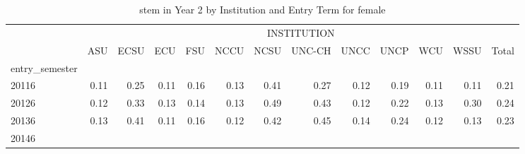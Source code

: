 \begin{table}[!h]
\caption{stem in Year 2 by Institution and Entry Term for female}
\centering
\begin{tabular}{lllllllllllll}
\cline{1-13}
\multicolumn{1}{c}{} &
  \multicolumn{12}{|c}{INSTITUTION} \\
\multicolumn{1}{c}{} &
  \multicolumn{1}{|r}{ASU} &
  \multicolumn{1}{r}{ECSU} &
  \multicolumn{1}{r}{ECU} &
  \multicolumn{1}{r}{FSU} &
  \multicolumn{1}{r}{NCCU} &
  \multicolumn{1}{r}{NCSU} &
  \multicolumn{1}{r}{UNC-CH} &
  \multicolumn{1}{r}{UNCC} &
  \multicolumn{1}{r}{UNCP} &
  \multicolumn{1}{r}{WCU} &
  \multicolumn{1}{r}{WSSU} &
  \multicolumn{1}{r}{Total} \\
\cline{1-13}
\multicolumn{1}{l}{entry\_semester} &
  \multicolumn{1}{|r}{} &
  \multicolumn{1}{r}{} &
  \multicolumn{1}{r}{} &
  \multicolumn{1}{r}{} &
  \multicolumn{1}{r}{} &
  \multicolumn{1}{r}{} &
  \multicolumn{1}{r}{} &
  \multicolumn{1}{r}{} &
  \multicolumn{1}{r}{} &
  \multicolumn{1}{r}{} &
  \multicolumn{1}{r}{} &
  \multicolumn{1}{r}{} \\
\multicolumn{1}{l}{\hspace{1em}20116} &
  \multicolumn{1}{|r}{0.11} &
  \multicolumn{1}{r}{0.25} &
  \multicolumn{1}{r}{0.11} &
  \multicolumn{1}{r}{0.16} &
  \multicolumn{1}{r}{0.13} &
  \multicolumn{1}{r}{0.41} &
  \multicolumn{1}{r}{0.27} &
  \multicolumn{1}{r}{0.12} &
  \multicolumn{1}{r}{0.19} &
  \multicolumn{1}{r}{0.11} &
  \multicolumn{1}{r}{0.11} &
  \multicolumn{1}{r}{0.21} \\
\multicolumn{1}{l}{\hspace{1em}20126} &
  \multicolumn{1}{|r}{0.12} &
  \multicolumn{1}{r}{0.33} &
  \multicolumn{1}{r}{0.13} &
  \multicolumn{1}{r}{0.14} &
  \multicolumn{1}{r}{0.13} &
  \multicolumn{1}{r}{0.49} &
  \multicolumn{1}{r}{0.43} &
  \multicolumn{1}{r}{0.12} &
  \multicolumn{1}{r}{0.22} &
  \multicolumn{1}{r}{0.13} &
  \multicolumn{1}{r}{0.30} &
  \multicolumn{1}{r}{0.24} \\
\multicolumn{1}{l}{\hspace{1em}20136} &
  \multicolumn{1}{|r}{0.13} &
  \multicolumn{1}{r}{0.41} &
  \multicolumn{1}{r}{0.11} &
  \multicolumn{1}{r}{0.16} &
  \multicolumn{1}{r}{0.12} &
  \multicolumn{1}{r}{0.42} &
  \multicolumn{1}{r}{0.45} &
  \multicolumn{1}{r}{0.14} &
  \multicolumn{1}{r}{0.24} &
  \multicolumn{1}{r}{0.12} &
  \multicolumn{1}{r}{0.13} &
  \multicolumn{1}{r}{0.23} \\
\multicolumn{1}{l}{\hspace{1em}20146} &

\end{tabular}
\end{table}
